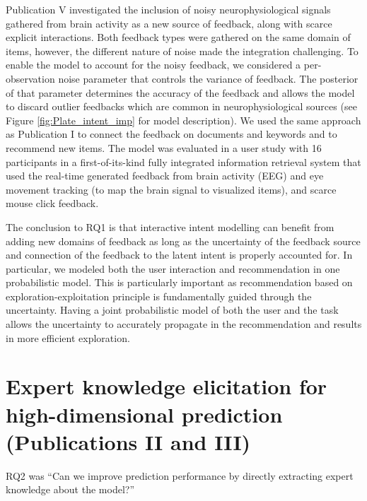 \documentclass[dissertation,math,vertlayout,pdfa,colorlinks]{aaltoseries}
\begin{document}
Publication V investigated the inclusion of noisy neurophysiological signals gathered from brain activity as a new source of feedback, along with scarce explicit interactions. Both feedback types were gathered on the same domain of items, however, the different nature of noise made the integration challenging.  
To enable the model to account for the noisy feedback, we considered a per-observation noise parameter that controls the variance of feedback. 
The posterior of that parameter determines the accuracy of the feedback and allows the model to discard outlier feedbacks which are common in neurophysiological sources (see Figure \ref{fig:Plate_intent_imp} for model description). We used the same approach as Publication I to connect the feedback on documents and keywords and to recommend new items. The model was evaluated in a user study with 16 participants in a first-of-its-kind fully integrated information retrieval system that used the real-time generated feedback from brain activity (EEG) and eye movement tracking (to map the brain signal to visualized items), and scarce mouse click feedback.

The conclusion to RQ1 is that interactive intent modelling can benefit from adding new domains of feedback as long as the uncertainty of the feedback source and connection of the feedback to the latent intent is properly accounted for. In particular, we modeled both the user interaction and recommendation in one probabilistic model. This is particularly important as recommendation based on exploration-exploitation principle is fundamentally guided through the uncertainty. Having a joint probabilistic model of both the user and the task allows the uncertainty to accurately propagate in the recommendation and results in more efficient exploration. 


\section{Expert knowledge elicitation for high-dimensional prediction (Publications II and III)}

RQ2 was ``Can we improve prediction performance by directly extracting expert knowledge about the model?''
\end{document}
